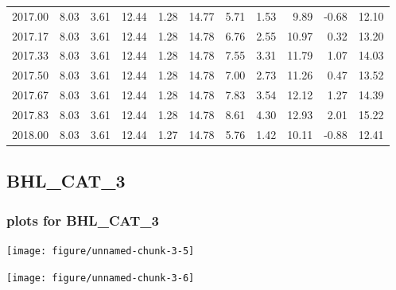 \documentclass[10pt,a4paper]{article}\usepackage[]{graphicx}\usepackage[]{color}
\makeatletter
\def\maxwidth{ %
  \ifdim\Gin@nat@width>\linewidth
    \linewidth
  \else
    \Gin@nat@width
  \fi
}
\newcommand{\AaA}{\_}
\makeatother
\begin{document}
\begin{table}[ht]
\begin{tabular}{rrrrrrrrrrr}
  2017.00 & 8.03 & 3.61 & 12.44 & 1.28 & 14.77 & 5.71 & 1.53 & 9.89 & -0.68 & 12.10 \\ 
  2017.17 & 8.03 & 3.61 & 12.44 & 1.28 & 14.78 & 6.76 & 2.55 & 10.97 & 0.32 & 13.20 \\ 
  2017.33 & 8.03 & 3.61 & 12.44 & 1.28 & 14.78 & 7.55 & 3.31 & 11.79 & 1.07 & 14.03 \\ 
  2017.50 & 8.03 & 3.61 & 12.44 & 1.28 & 14.78 & 7.00 & 2.73 & 11.26 & 0.47 & 13.52 \\ 
  2017.67 & 8.03 & 3.61 & 12.44 & 1.28 & 14.78 & 7.83 & 3.54 & 12.12 & 1.27 & 14.39 \\ 
  2017.83 & 8.03 & 3.61 & 12.44 & 1.28 & 14.78 & 8.61 & 4.30 & 12.93 & 2.01 & 15.22 \\ 
  2018.00 & 8.03 & 3.61 & 12.44 & 1.27 & 14.78 & 5.76 & 1.42 & 10.11 & -0.88 & 12.41 \\ 
   \hline
\end{tabular}
\end{table}

\newpage
\subsection{BHL\AaA CAT\AaA 3}
\subsubsection{plots for BHL\AaA CAT\AaA 3}

\texttt{[image: figure/unnamed-chunk-3-5]} 

\newpage

\texttt{[image: figure/unnamed-chunk-3-6]} 

\newpage
\end{document}
